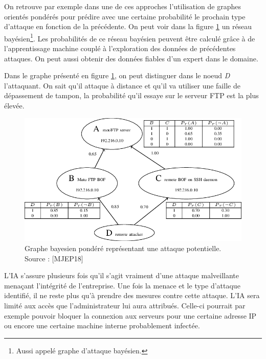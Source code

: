 \documentclass[a4paper, 12pt]{article}
\begin{document}
\begin{spacing}{1.1}
      On retrouve par exemple dans une de ces approches l’utilisation de graphes
      orientés pondérés pour prédire avec une certaine probabilité le prochain
      type d’attaque en fonction de la précédente. On peut voir dans la figure
      \ref{fig:1} un réseau bayésien\footnote{Aussi appelé graphe d'attaque
      bayésien.}. Les probabilités de ce réseau bayésien peuvent être calculé
      grâce à de l'apprentissage machine couplé à l'exploration des données de
      précédentes attaques. On peut aussi obtenir des données fiables d'un
      expert dans le domaine.

      Dans le graphe présenté en figure \ref{fig:1}, on peut distinguer dans le
      noeud \textit{D} l'attaquant. On sait qu'il attaque à distance et qu'il va
      utiliser une faille de dépassement de tampon, la probabilité qu'il essaye
      sur le serveur FTP est la plus élevée.

      \begin{figure}[h]
        \centering
        \includegraphics[scale=.5]{img/attackgraph.png}
        \caption{Graphe bayesien pondéré représentant une attaque potentielle.
        Source : [MJEP18]}
        \label{fig:1}
      \end{figure}

      L’IA s’assure plusieurs fois qu’il s’agit vraiment d’une attaque
      malveillante menaçant l’intégrité de l’entreprise. Une fois la menace et
      le type d’attaque identifié, il ne reste plus qu’à prendre des mesures
      contre cette attaque. L’IA sera limité aux accès que l’administrateur lui
      aura attribués. Celle-ci pourrait par exemple pouvoir bloquer la connexion
      aux serveurs pour une certaine adresse IP ou encore une certaine machine
      interne probablement infectée.


\end{spacing}
\end{document}
